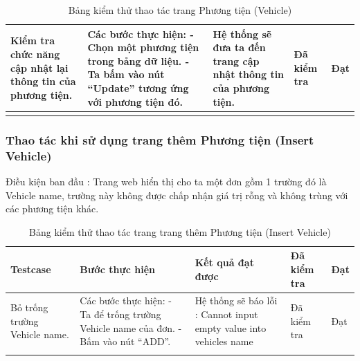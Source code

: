 \documentclass{article}
\begin{document}
\begin{longtable}{ | p{} |p{} | p{}  | p{}  | p{}  | }
\hline
Kiểm tra chức năng cập nhật lại thông tin của phương tiện. &
Các bước thực hiện: \newline
- Chọn một phương tiện trong bảng dữ liệu.   \newline
- Ta bấm vào nút “Update” tương ứng với phương tiện đó. 
&
Hệ thống sẽ đưa ta đến trang cập nhật thông tin của phương tiện. &
Đã kiểm tra &
Đạt \\

\hline
\caption{Bảng kiểm thử thao tác trang Phương tiện (Vehicle)}
\end{longtable}

\subsubsection{Thao tác khi sử dụng trang thêm Phương tiện (Insert Vehicle)}
Điều kiện ban đầu : Trang web hiển thị cho ta một đơn gồm 1 trường đó là Vehicle name, trường này không được chấp nhận giá trị rỗng và không trùng với các phương tiện khác. \newline
\begin{longtable}{ | p{} |p{} | p{}  | p{}  | p{}  | } 
\hline
\textbf{Testcase}& \textbf{Bước thực hiện}& \textbf{Kết quả đạt được} & \textbf{Đã kiểm tra}& \textbf{Đạt} \\ 
\hline
\hline
Bỏ trống trường Vehicle name. &
Các bước thực hiện: \newline
- Ta để trống trường Vehicle name của đơn. \newline
- Bấm vào nút “ADD”.
&
Hệ thống sẽ báo lỗi : Cannot input empty value into vehicles name
 &
Đã kiểm tra &
Đạt \\

\hline
\caption{Bảng kiểm thử thao tác trang trang thêm Phương tiện (Insert Vehicle)}
\end{longtable}

\end{document}
